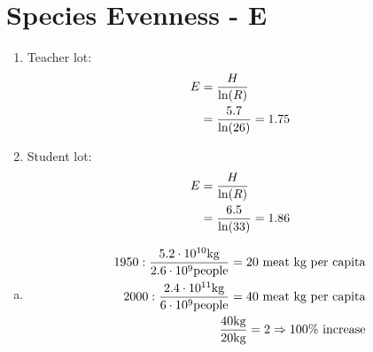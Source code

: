 \documentclass[11pt]{article}
\newcommand*{\set}{\setcounter{equation}{0}}
\begin{document}
\section{Species Evenness - E}
\begin{enumerate}
    \item Teacher lot:
        \begin{align}
            \set
            E&=\frac{H}{\ln(R)}\\
            &=\frac{5.7}{\ln(26)}=1.75
        \end{align}
    \item Student lot:
        \begin{align}
            \set
            E&=\frac{H}{\ln(R)}\\
            &=\frac{6.5}{\ln(33)}=1.86
        \end{align}
\end{enumerate}

\begin{enumerate}[(a)]
    \item 
        \begin{align}
            \set
            1950:\frac{5.2\cdot 10^{10}\text{kg}}{2.6\cdot 10^9\text{people}}=\text{20 meat kg per capita}\\
            2000:\frac{2.4\cdot 10^{11}\text{kg}}{6\cdot 10^9\text{people}}=\text{40 meat kg per capita}\\
            \frac{40\text{kg}}{20\text{kg}}=2\Rightarrow\text{100\% increase}
        \end{align}
\end{enumerate}
\end{document}
